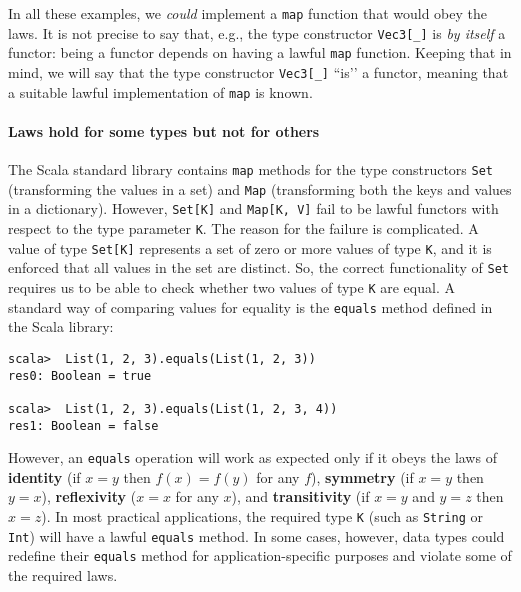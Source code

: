 In all these examples, we \emph{could} implement a \lstinline!map!
function that would obey the laws. It is not precise to say that,
e.g., the type constructor \lstinline!Vec3[_]! is \emph{by itself}
a functor: being a functor depends on having a lawful \lstinline!map!
function. Keeping that in mind, we will say that the type constructor
\lstinline!Vec3[_]! \textsf{``}is\textsf{'}' a functor, meaning that a suitable lawful
implementation of \lstinline!map! is known.

\paragraph{Laws hold for some types but not for others}

The Scala standard library contains \lstinline!map! methods for the
type constructors \lstinline!Set! (transforming the values in a set)
and \lstinline!Map! (transforming both the keys and values in a dictionary).
However, \lstinline!Set[K]! and \lstinline!Map[K, V]! fail to be
lawful functors with respect to the type parameter \lstinline!K!.
The reason for the failure is complicated. A value of type \lstinline!Set[K]!
represents a set of zero or more values of type \lstinline!K!, and
it is enforced that all values in the set are distinct. So, the correct
functionality of \lstinline!Set! requires us to be able to\emph{
}check whether two values of type \lstinline!K! are equal. A standard
way of comparing values for equality is the \lstinline!equals! method
defined in the Scala library:
\begin{lstlisting}
scala>  List(1, 2, 3).equals(List(1, 2, 3))
res0: Boolean = true

scala>  List(1, 2, 3).equals(List(1, 2, 3, 4))
res1: Boolean = false
\end{lstlisting}
However, an \lstinline!equals! operation will work as expected only
if it obeys the \label{par:label-equality-laws}laws of \textbf{identity}
(if $x=y$ then $f(x)=f(y)$ for any $f$), \textbf{symmetry} (if
$x=y$ then $y=x$), \textbf{reflexivity}
($x=x$ for any $x$), and \textbf{transitivity}
(if $x=y$ and $y=z$ then $x=z$). In most practical applications,
the required type \lstinline!K! (such as \lstinline!String! or \lstinline!Int!)
will have a lawful \lstinline!equals! method. In some cases, however,
data types could redefine their \lstinline!equals! method for application-specific
purposes and violate some of the required laws.

